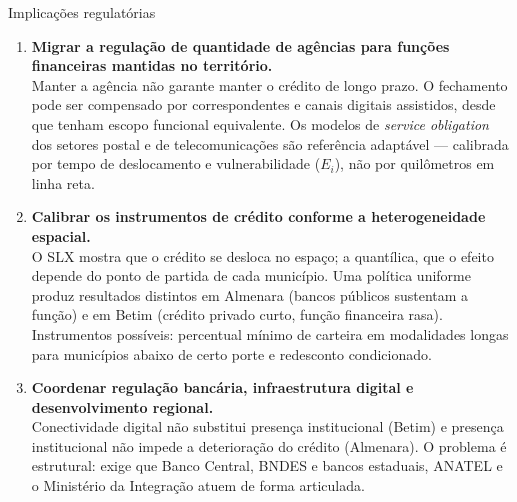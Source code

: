 \documentclass[aspectratio=169,10pt]{beamer}
\newcommand{\az}[1]{\textcolor{cedazul}{\textbf{#1}}}
\newcommand{\ex}{E_i}
\begin{document}
\begin{frame}{Implicações regulatórias}
  \small
  \begin{enumerate}\setlength{\itemsep}{0.9em}
    \item \az{Migrar a regulação de quantidade de agências para funções financeiras
      mantidas no território.}\\
      \footnotesize Manter a agência não garante manter o crédito de longo prazo. O
      fechamento pode ser compensado por correspondentes e canais digitais
      assistidos, desde que tenham escopo funcional equivalente. Os modelos de
      \emph{service obligation} dos setores postal e de telecomunicações são
      referência adaptável --- calibrada por tempo de deslocamento e vulnerabilidade
      ($\ex$), não por quilômetros em linha reta.
    \item \az{Calibrar os instrumentos de crédito conforme a heterogeneidade
      espacial.}\\
      \footnotesize O SLX mostra que o crédito se desloca no espaço; a quantílica,
      que o efeito depende do ponto de partida de cada município. Uma política
      uniforme produz resultados distintos em Almenara (bancos públicos sustentam a
      função) e em Betim (crédito privado curto, função financeira rasa).
      Instrumentos possíveis: percentual mínimo de carteira em modalidades longas
      para municípios abaixo de certo porte e redesconto condicionado.
    \item \az{Coordenar regulação bancária, infraestrutura digital e desenvolvimento
      regional.}\\
      \footnotesize Conectividade digital não substitui presença institucional
      (Betim) e presença institucional não impede a deterioração do crédito
      (Almenara). O problema é estrutural: exige que Banco Central, BNDES e bancos
      estaduais, ANATEL e o Ministério da Integração atuem de forma articulada.
  \end{enumerate}
\end{frame}
\end{document}
